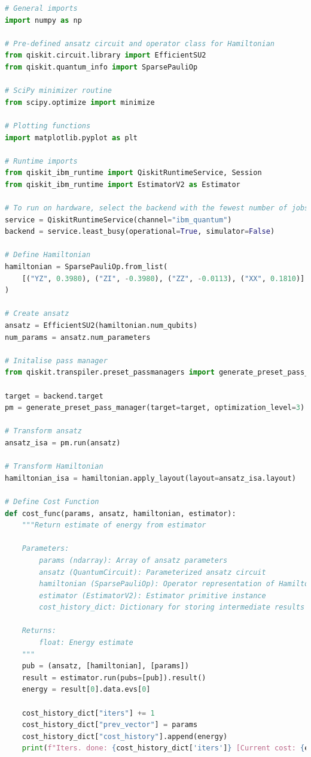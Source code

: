 \documentclass{article}
\begin{document}
\begin{lstlisting}[language=Python]
# General imports
import numpy as np

# Pre-defined ansatz circuit and operator class for Hamiltonian
from qiskit.circuit.library import EfficientSU2
from qiskit.quantum_info import SparsePauliOp

# SciPy minimizer routine
from scipy.optimize import minimize

# Plotting functions
import matplotlib.pyplot as plt

# Runtime imports
from qiskit_ibm_runtime import QiskitRuntimeService, Session
from qiskit_ibm_runtime import EstimatorV2 as Estimator

# To run on hardware, select the backend with the fewest number of jobs in the queue
service = QiskitRuntimeService(channel="ibm_quantum")
backend = service.least_busy(operational=True, simulator=False)

# Define Hamiltonian
hamiltonian = SparsePauliOp.from_list(
    [("YZ", 0.3980), ("ZI", -0.3980), ("ZZ", -0.0113), ("XX", 0.1810)]
)

# Create ansatz
ansatz = EfficientSU2(hamiltonian.num_qubits)
num_params = ansatz.num_parameters

# Initalise pass manager
from qiskit.transpiler.preset_passmanagers import generate_preset_pass_manager

target = backend.target
pm = generate_preset_pass_manager(target=target, optimization_level=3)

# Transform ansatz
ansatz_isa = pm.run(ansatz)

# Transform Hamiltonian
hamiltonian_isa = hamiltonian.apply_layout(layout=ansatz_isa.layout)

# Define Cost Function
def cost_func(params, ansatz, hamiltonian, estimator):
    """Return estimate of energy from estimator

    Parameters:
        params (ndarray): Array of ansatz parameters
        ansatz (QuantumCircuit): Parameterized ansatz circuit
        hamiltonian (SparsePauliOp): Operator representation of Hamiltonian
        estimator (EstimatorV2): Estimator primitive instance
        cost_history_dict: Dictionary for storing intermediate results

    Returns:
        float: Energy estimate
    """
    pub = (ansatz, [hamiltonian], [params])
    result = estimator.run(pubs=[pub]).result()
    energy = result[0].data.evs[0]

    cost_history_dict["iters"] += 1
    cost_history_dict["prev_vector"] = params
    cost_history_dict["cost_history"].append(energy)
    print(f"Iters. done: {cost_history_dict['iters']} [Current cost: {energy}]")


\end{lstlisting}
\end{document}
